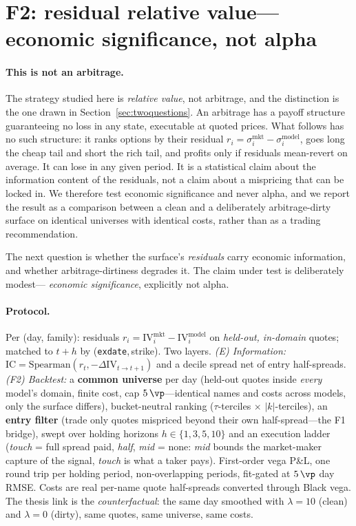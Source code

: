 \section{F2: residual relative value---economic significance, not alpha}\label{sec:residual}

\paragraph{This is not an arbitrage.} The strategy studied here is \emph{relative value}, not
arbitrage, and the distinction is the one drawn in Section~\ref{sec:twoquestions}. An arbitrage
has a payoff structure guaranteeing no loss in any state, executable at quoted prices. What
follows has no such structure: it ranks options by their residual
$r_i=\sigma^{\mathrm{mkt}}_i-\sigma^{\mathrm{model}}_i$, goes long the cheap tail and short the
rich tail, and profits only if residuals mean-revert on average. It can lose in any given
period. It is a statistical claim about the information content of the residuals, not a claim
about a mispricing that can be locked in. We therefore test economic significance and never
alpha, and we report the result as a comparison between a clean and a deliberately
arbitrage-dirty surface on identical universes with identical costs, rather than as a trading
recommendation.

The next question is whether the surface's \emph{residuals} carry economic information, and
whether arbitrage-dirtiness degrades it. The claim under test is deliberately modest---%
\emph{economic significance}, explicitly not alpha.

\paragraph{Protocol.} Per (day, family): residuals
$r_i=\mathrm{IV}^{\mathrm{mkt}}_i-\mathrm{IV}^{\mathrm{model}}_i$ on \emph{held-out,
in-domain} quotes; matched to $t+h$ by (\texttt{exdate},\,strike). Two layers. \emph{(E)
Information:} $\mathrm{IC}=\mathrm{Spearman}(r_t,-\Delta\mathrm{IV}_{t\to t+1})$ and a
decile spread net of entry half-spreads. \emph{(F2) Backtest:} a \textbf{common universe}
per day (held-out quotes inside \emph{every} model's domain, finite cost, cap
$5\,\vp$---identical names and costs across models, only the surface differs),
bucket-neutral ranking ($\tau$-terciles $\times$ $|k|$-terciles), an \textbf{entry filter}
(trade only quotes mispriced beyond their own half-spread---the F1 bridge), swept over
holding horizons $h\in\{1,3,5,10\}$ and an execution ladder (\emph{touch} = full spread
paid, \emph{half}, \emph{mid} = none: \emph{mid} bounds the market-maker capture of the
signal, \emph{touch} is what a taker pays). First-order vega P\&L, one round trip per
holding period, non-overlapping periods, fit-gated at $5\,\vp$ day RMSE. Costs are real
per-name quote half-spreads converted through Black vega. The thesis link is the
\emph{counterfactual}: the same day smoothed with $\lambda=10$ (clean) and $\lambda=0$
(dirty), same quotes, same universe, same costs.

